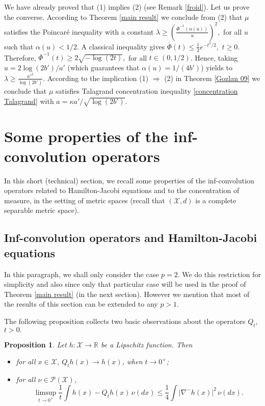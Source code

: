 \documentclass[11pt]{amsart}
\newtheorem{prop}[equation]{Proposition}
\numberwithin{equation}{section}
\begin{document}
\proof
We have already proved that (1) implies (2) (see Remark \ref{froid}). Let us prove the converse. According to Theorem \ref{main result} we conclude from (2) that $\mu$ satisfies the Poincar\'e inequality with a constant $\lambda \geq \left(\frac{\overline{\Phi}^{-1}(\alpha(u))}{u}\right)^{2},$ for all $u$ such that $\alpha(u)<1/2.$ A classical inequality gives $\overline{\Phi}(t)\leq \frac{1}{2}e^{-t^2/2},$ $t\geq0.$ Therefore, 
$\overline{\Phi}^{-1}(t)\geq 2\sqrt{-\log(2t)},$ for all $t\in (0,1/2)$. Hence, taking $u=2\log(2b')/a'$
(which guarantees that $\alpha(u)=1/(4b')$) yields to $\lambda \geq \frac{a'^2}{\log(2b')}$. According to the implication (1) $\Rightarrow$ (2) in Theorem \ref{Gozlan 09} we conclude that $\mu$ satisfies Talagrand concentration inequality \eqref{concentration Talagrand} with $a=\kappa a'/\sqrt{\log(2b')}.$
\endproof

\section{Some properties of the inf-convolution operators}

In this short (technical) section, we recall some properties of the inf-convolution operators related to Hamilton-Jacobi equations and to the concentration of measure, in the setting of metric spaces (recall that $({\mathcal{X}},d)$ is a complete separable metric space).

\subsection{Inf-convolution operators and Hamilton-Jacobi equations}

In this paragraph, we shall only consider  the case $p=2$. We do this restriction for simplicity and also since only that particular case will be used in the proof of Theorem \ref{main result} (in the next section). However we mention that most of the results of this section can be extended to any $p>1$. 

The following proposition collects two basic observations about the operators $Q_t$, $t>0.$  
\begin{prop}\label{prop:Qt} Let $h:{\mathcal{X}}\to {\mathbb{R}}$ be a Lipschitz function. Then
\begin{itemize}
\item[(i)] for all $x\in {\mathcal{X}}$, $Q_th(x) \to h(x)$, when $t\to 0^+$;
\item[(ii)] for all $\nu\in \mathcal{P}({\mathcal{X}})$, 
\begin{equation}\label{eq:HJ int}
\limsup_{t \to 0^+} \frac{1}{t}\int h(x)-Q_th(x)\,\nu(dx) \leq \frac{1}{4}\int |\nabla^-h(x)|^2\,\nu(dx).\end{equation}
\end{itemize}
\end{prop}
\end{document}
